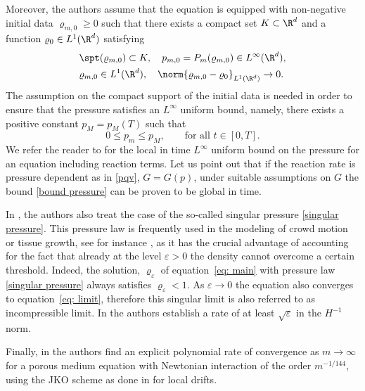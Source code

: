 Moreover, the authors assume that the equation is equipped with non-negative initial data $\varrho_{m,0}\geq 0$ such that there exists a compact set $K\subset\R^d$ and a function $\varrho_0\in L^1(\R^d)$ satisfying
\begin{equation}\label{assum: DDP}
\begin{split}
&\spt({\varrho_{m,0}})\subset K,\quad p_{m,0}=P_m(\varrho_{m,0})\in L^\infty(\R^d),\\
&\varrho_{m,0}\in L^1(\R^d), \quad\norm{\varrho_{m,0} - \varrho_{0}}_{L^1(\R^d)}\to 0.
\end{split}
\end{equation}
The assumption on the compact support of the initial data is needed in order to ensure that the pressure satisfies an $L^\infty$ uniform bound, namely, there exists a positive constant $p_M=p_M(T)$ such that
\begin{equation}
\label{bound pressure}
0 \le p_m \leq p_M, \qquad \text{for all } t\in [0,T].
\end{equation}
We refer the reader to \cite[Lem.\,A.10]{KPW19} for the local in time $L^\infty$ uniform bound on the pressure for an equation including reaction terms. Let us point out that if the reaction rate is pressure dependent as in \eqref{pqv}, $G=G(p)$, under suitable assumptions on $G$ the bound \eqref{bound pressure} can be proven to be global in time.

In \cite{DDP2021}, the authors also treat the case of the so-called singular pressure \eqref{singular pressure}.
This pressure law is frequently used in the modeling of crowd motion or tissue growth, see for instance \cite{hecht2017incompressible, BDDR2008, DHV, DegondHua2013}, as it has the crucial advantage of accounting for the fact that already at the level $\varepsilon>0$ the density cannot overcome a certain threshold. Indeed, the solution, $\varrho_\varepsilon$ of equation~\eqref{eq: main} with pressure law \eqref{singular pressure} always satisfies $\varrho_\varepsilon<1$. As $\varepsilon\to 0$ the equation also converges to equation~\eqref{eq: limit}, therefore this singular limit is also referred to as incompressible limit. In \cite{DDP2021} the authors establish a rate of at least $\sqrt\varepsilon$ in the $H^{-1}$ norm.

Finally, in \cite{CKY18} the authors find an explicit polynomial rate of convergence as $m\to\infty$ for a porous medium equation with Newtonian interaction of the order $m^{-1/144}$, using the JKO scheme as done in \cite{AKY14} for local drifts.

